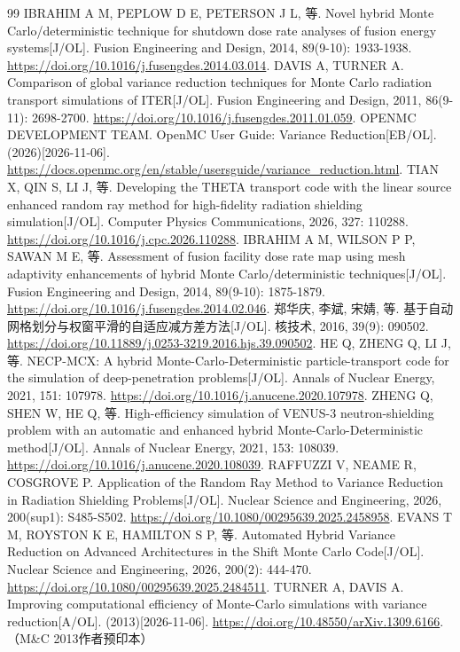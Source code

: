 \documentclass[UTF8, zihao=-4, fontset=none, a4paper]{ctexart}
\begin{document}
\begin{thebibliography}{99}
 IBRAHIM A M, PEPLOW D E, PETERSON J L, 等. Novel hybrid Monte Carlo/deterministic technique for shutdown dose rate analyses of fusion energy systems{[}J/OL{]}. Fusion Engineering and Design, 2014, 89(9-10): 1933-1938. \url{https://doi.org/10.1016/j.fusengdes.2014.03.014}.
 DAVIS A, TURNER A. Comparison of global variance reduction techniques for Monte Carlo radiation transport simulations of ITER{[}J/OL{]}. Fusion Engineering and Design, 2011, 86(9-11): 2698-2700. \url{https://doi.org/10.1016/j.fusengdes.2011.01.059}.
 OPENMC DEVELOPMENT TEAM. OpenMC User Guide: Variance Reduction{[}EB/OL{]}. (2026)[2026-11-06]. \url{https://docs.openmc.org/en/stable/usersguide/variance_reduction.html}.
 TIAN X, QIN S, LI J, 等. Developing the THETA transport code with the linear source enhanced random ray method for high-fidelity radiation shielding simulation{[}J/OL{]}. Computer Physics Communications, 2026, 327: 110288. \url{https://doi.org/10.1016/j.cpc.2026.110288}.
 IBRAHIM A M, WILSON P P, SAWAN M E, 等. Assessment of fusion facility dose rate map using mesh adaptivity enhancements of hybrid Monte Carlo/deterministic techniques{[}J/OL{]}. Fusion Engineering and Design, 2014, 89(9-10): 1875-1879. \url{https://doi.org/10.1016/j.fusengdes.2014.02.046}.
 郑华庆, 李斌, 宋婧, 等. 基于自动网格划分与权窗平滑的自适应减方差方法{[}J/OL{]}. 核技术, 2016, 39(9): 090502. \url{https://doi.org/10.11889/j.0253-3219.2016.hjs.39.090502}.
 HE Q, ZHENG Q, LI J, 等. NECP-MCX: A hybrid Monte-Carlo-Deterministic particle-transport code for the simulation of deep-penetration problems{[}J/OL{]}. Annals of Nuclear Energy, 2021, 151: 107978. \url{https://doi.org/10.1016/j.anucene.2020.107978}.
 ZHENG Q, SHEN W, HE Q, 等. High-efficiency simulation of VENUS-3 neutron-shielding problem with an automatic and enhanced hybrid Monte-Carlo-Deterministic method{[}J/OL{]}. Annals of Nuclear Energy, 2021, 153: 108039. \url{https://doi.org/10.1016/j.anucene.2020.108039}.
 RAFFUZZI V, NEAME R, COSGROVE P. Application of the Random Ray Method to Variance Reduction in Radiation Shielding Problems{[}J/OL{]}. Nuclear Science and Engineering, 2026, 200(sup1): S485-S502. \url{https://doi.org/10.1080/00295639.2025.2458958}.
 EVANS T M, ROYSTON K E, HAMILTON S P, 等. Automated Hybrid Variance Reduction on Advanced Architectures in the Shift Monte Carlo Code{[}J/OL{]}. Nuclear Science and Engineering, 2026, 200(2): 444-470. \url{https://doi.org/10.1080/00295639.2025.2484511}.
 TURNER A, DAVIS A. Improving computational efficiency of Monte-Carlo simulations with variance reduction{[}A/OL{]}. (2013)[2026-11-06]. \url{https://doi.org/10.48550/arXiv.1309.6166}.（M\&C 2013作者预印本）
\end{thebibliography}
\end{document}
